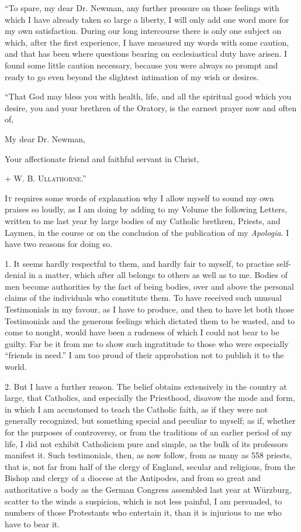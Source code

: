 ``To spare, my dear Dr. Newman, any further pressure on
those feelings with which I have already taken so large a liberty, I
will only add one word more for my own satisfaction. During our long
intercourse there is only one subject on which, after the first
experience, I have measured my words with some caution, and that has
been where questions bearing on ecclesiastical duty have arisen. I found
some little caution necessary, because you were always so prompt and
ready to go even beyond the slightest intimation of my wish or desires.

``That God may bless you with health, life, and all the spiritual
good which you desire, you and your brethren of the Oratory, is the
earnest prayer now and often of,

My dear Dr. Newman,

Your affectionate friend and faithful servant in Christ,

+ W. B. U\textsc{llathorne}.''


I\textsc{t} requires some words of explanation why I allow myself to
sound my own praises so loudly, as I am doing by adding to my Volume the
following Letters, written to me last year by large bodies of my
Catholic brethren, Priests, and Laymen, in the course or on the
conclusion of the publication of my \emph{Apologia}. I have two reasons for
doing so.

1. It seems hardly respectful to them, and hardly fair to myself, to
practise self-denial in a matter, which after all belongs to others as
well as to me. Bodies of men become authorities by the fact of being
bodies, over and above the personal claims of the individuals who
constitute them. To have received such unusual Testimonials in my favour,
as I have to produce, and then to have let both those Testimonials and the generous feelings which dictated
them to be wasted, and to
come to nought, would have been a rudeness of which I could not bear to
be guilty. Far be it from me to show such ingratitude to those who were
especially ``friends in need.'' I am too proud of their
approbation not to publish it to the world.

2. But I have a further reason. The belief obtains extensively in the
country at large, that Catholics, and especially the Priesthood, disavow
the mode and form, in which I am accustomed to teach the Catholic faith,
as if they were not generally recognized, but something special and
peculiar to myself; as if, whether for the purposes of controversy, or
from the traditions of an earlier period of my life, I did not exhibit
Catholicism pure and simple, as the bulk of its professors
manifest it. Such testimonials, then, as now follow, from as many as 558
priests, that is, not far from half of the clergy of England, secular
and religious, from the Bishop and clergy of a diocese at the Antipodes,
and from so great and authoritative a body as the German Congress
assembled last year at Würzburg, scatter to the winds a suspicion,
which is not less painful, I am persuaded, to numbers of those
Protestants who entertain it, than it is injurious to me who have to
bear it.

